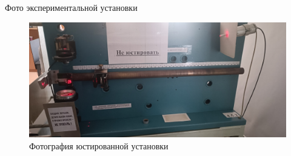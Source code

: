 \documentclass[11pt]{beamer} %
\begin{document}
    \begin{frame}{Фото экспериментальной установки}
    \small
    \begin{figure}[H]
        \centering
        \includegraphics[width = \textwidth]{images/installation_photo.jpg}
        \caption{Фотография юстированной установки}
        \label{fig:installation_2}
    \end{figure}
    \end{frame}
\end{document}
